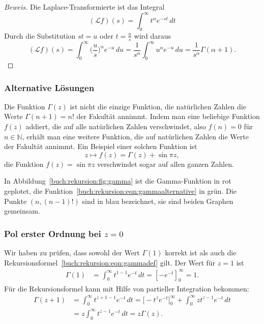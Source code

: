 \begin{proof}[Beweis]
Die Laplace-Transformierte ist das Integral
\[
(\mathcal{L}f)(s)
=
\int_0^\infty t^\alpha e^{-st}\,dt
\]
Durch die Substitution $st = u$ oder $t=\frac{u}{s}$ wird daraus
\[
(\mathcal{L}f)(s)
=
\int_0^\infty \biggl(\frac{u}{s}\biggr)^\alpha e^{-u}\,du
=
\frac{1}{s^\alpha}\int_0^\infty u^{\alpha} e^{-u}\,du
=
\frac{1}{s^\alpha} \Gamma(\alpha+1).
\]
\end{proof}

\subsubsection{Alternative Lösungen}
Die Funktion $\Gamma(z)$ ist nicht die einzige Funktion, die natürlichen
Zahlen die Werte $\Gamma(n+1) = n!$ der Fakultät annimmt.
Indem man eine beliebige Funktion $f(z)$ addiert, die auf alle
natürlichen Zahlen verschwindet, also $f(n)=0$ für $n\in\mathbb{N}$,
erhält man eine weitere Funktion, die auf natürlichen Zahlen
die Werte der Fakultät annimmt.
Ein Beispiel einer solchen Funktion ist
\begin{equation}
z\mapsto f(z)=\Gamma(z) + \sin \pi z,
\label{buch:rekursion:eqn:gammaalternative}
\end{equation}
die Funktion $f(z)=\sin\pi z$ verschwindet sogar auf allen ganzen
Zahlen.

In Abbildung~\ref{buch:rekursion:fig:gamma} ist die Gamma-Funktion
in rot geplotet, die Funktion~\eqref{buch:rekursion:eqn:gammaalternative}
in grün.
Die Punkte $(n,(n-1)!)$ sind in blau bezeichnet, sie sind beiden Graphen
gemeinsam.

\subsubsection{Pol erster Ordnung bei $z=0$}
Wir haben zu prüfen, dass sowohl der Wert $\Gamma(1)$ korrekt ist als
auch die Rekursionsformel~\eqref{buch:rekursion:eqn:gammadef} gilt.
Der Wert für $z=1$ ist
\begin{align*}
\Gamma(1)
&=
\int_0^\infty t^{1-1}e^{-t}\,dt
=
\left[ -e^{-t} \right]_0^\infty
=
1.
\end{align*}
Für die Rekursionsformel kann mit Hilfe von partieller Integration
bekommen:
\begin{align*}
\Gamma(z+1)
&=
\int_0^\infty t^{z+1-1}e^{-t}\,dt
=
\biggl[-t^{z}e^{-t}\biggr]_0^\infty
+
\int_0^\infty z t^{z-1}e^{-t}\,dt
\\
&=
z
\int_0^\infty
t^{z-1}e^{-t}\,dt
=
z \Gamma(z).
\end{align*}

